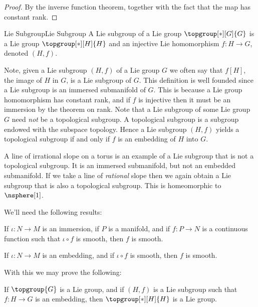 \documentclass[oneside]{book}                                                  %
\begin{document}
        \begin{proof}
            By the inverse function theorem, together with the fact that the map
            has constant rank.
        \end{proof}
        \begin{fdefinition}{Lie Subgroup}{Lie Subgroup}
            A Lie subgroup of a Lie group $\topgroup[*][G]{G}$ is a Lie group
            $\topgroup[*][H]{H}$ and an injective Lie homomorphism
            $f:H\rightarrow{G}$, denoted $(H,f)$.
        \end{fdefinition}
        Note, given a Lie subgroup $(H,f)$ of a Lie group $G$ we often say that
        $f[H]$, the image of $H$ in $G$, is a Lie subgroup of $G$. This
        definition is well founded since a Lie subgroup is an immersed
        submanifold of $G$. This is because a Lie group homomorphism has
        constant rank, and if $f$ is injective then it must be an immersion by
        the theorem on rank. Note that a Lie subgroup of some Lie group $G$ need
        \textit{not} be a topological subgroup. A topological subgroup is a
        subgroup endowed with the subspace topology. Hence a Lie subgroup
        $(H,f)$ yields a topological subgroup if and only if $f$ is an embedding
        of $H$ into $G$.
        \begin{example}
            A line of irrational slope on a torus is an example of a Lie
            subgroup that is not a topological subgroup. It is an immersed
            submanifold, but not an embedded submanifold. If we take a line of
            \textit{rational} slope then we again obtain a Lie subgroup that is
            also a topological subgroup. This is homeomorphic to $\nsphere[1]$.
        \end{example}
        We'll need the following results:
        \begin{theorem}
            If $\iota:N\rightarrow{M}$ is an immersion, if $P$ is a manifold,
            and if $f:P\rightarrow{N}$ is a continuous function such that
            $\iota\circ{f}$ is smooth, then $f$ is smooth.
        \end{theorem}
        \begin{theorem}
            If $\iota:N\rightarrow{M}$ is an embedding, and if $\iota\circ{f}$
            is smooth, then $f$ is smooth.
        \end{theorem}
        With this we may prove the following:
        \begin{theorem}
            If $\topgroup{G}$ is a Lie group, and if $(H,f)$ is a Lie subgroup
            such that $f:H\rightarrow{G}$ is an embedding, then
            $\topgroup[*][H]{H}$ is a Lie group.
        \end{theorem}
\end{document}
